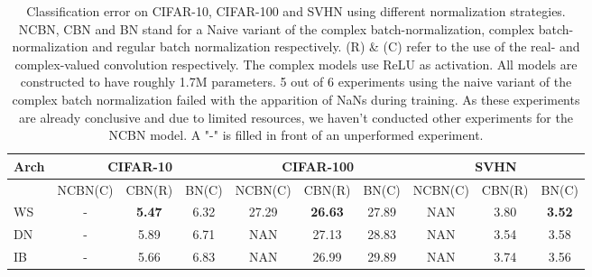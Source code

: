 \documentclass{article}
\begin{document}
\begin{table}[t]
\vskip 0.15in
\begin{center}
\caption{Classification error on CIFAR-10, CIFAR-100 and SVHN using different normalization strategies. NCBN, CBN and BN stand for a Naive variant of the complex batch-normalization, complex batch-normalization and regular batch normalization respectively. (R) \& (C) refer to the use of the real- and complex-valued convolution respectively. The complex models use ReLU as activation. All models are constructed to have roughly 1.7M parameters. 5 out of 6 experiments using the naive variant of the complex batch normalization failed with the apparition of NaNs during training. As these experiments are already conclusive and due to limited resources, we haven't conducted other experiments for the NCBN model. A "-" is filled in front of an unperformed experiment.}
\label{results_ablation}
\begin{small}
\begin{sc}
\begin{tabular}{l|ccc|ccc|ccc}
\toprule
Arch & \multicolumn{3}{c|}{CIFAR-10} & \multicolumn{3}{c|}{CIFAR-100} & \multicolumn{3}{c}{SVHN} \\
\midrule
& \hspace{-1mm} NCBN(C) & \hspace{-4mm} CBN(R) \hspace{-4mm} & BN(C) & NCBN(C) & \hspace{-4mm} CBN(R) \hspace{-4mm} & BN(C) & NCBN(C) & \hspace{-4mm} CBN(R) \hspace{-4mm} & BN(C) \\
\midrule
WS & - & \textbf{5.47} & 6.32 & 27.29 & \textbf{26.63} & 27.89 & NAN & 3.80 & \textbf{3.52} \\
DN & - & 5.89 & 6.71 & NAN & 27.13 & 28.83 & NAN & 3.54 & 3.58 \\
IB & - & 5.66 & 6.83 & NAN & 26.99 & 29.89 & NAN & 3.74 & 3.56 \\
\bottomrule
\end{tabular}
\end{sc}
\end{small}
\end{center}
\vskip -0.1in
\end{table}
\end{document}
